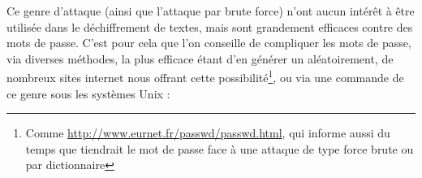 Ce genre d'attaque (ainsi que l'attaque par brute force) n'ont
aucun intérêt à être utilisée dans le déchiffrement de textes,
mais sont grandement efficaces contre des mots de passe. C'est
pour cela que l'on conseille de compliquer les mots de passe, via
diverses méthodes, la plus efficace étant d'en générer un
aléatoirement, de nombreux sites internet nous offrant cette
possibilité\footnote{Comme
\url{http://www.eurnet.fr/passwd/passwd.html}, qui informe aussi
du temps que tiendrait le mot de passe face à une attaque de type
force brute ou par dictionnaire}, ou via une commande de ce genre sous les systèmes
Unix :
\lstset{language=bash}
\begin{lstlistings}
\end{lstlistings}

